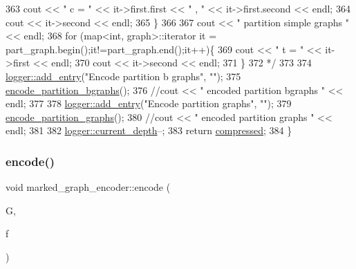 \begin{DoxyCode}
363 \textcolor{comment}{    cout << " c = " << it->first.first << " , " << it->first.second << endl;}
364 \textcolor{comment}{    cout << it->second << endl;}
365 \textcolor{comment}{  \}}
366 \textcolor{comment}{}
367 \textcolor{comment}{  cout << " partition simple graphs " << endl;}
368 \textcolor{comment}{  for (map<int, graph>::iterator it = part\_graph.begin();it!=part\_graph.end();it++)\{}
369 \textcolor{comment}{    cout << " t = " << it->first << endl;}
370 \textcolor{comment}{    cout << it->second << endl;}
371 \textcolor{comment}{  \}}
372 \textcolor{comment}{  */}
373 
374   \hyperlink{classlogger_a710163deb17bc81f70d53d285b8ac9ac}{logger::add\_entry}(\textcolor{stringliteral}{"Encode partition b graphs"}, \textcolor{stringliteral}{""});
375   \hyperlink{classmarked__graph__encoder_aa113c4870e3221faa332b2151b63d9e6}{encode\_partition\_bgraphs}();
376   \textcolor{comment}{//cout << " encoded partition bgraphs " << endl;}
377 
378   \hyperlink{classlogger_a710163deb17bc81f70d53d285b8ac9ac}{logger::add\_entry}(\textcolor{stringliteral}{"Encode partition graphs"}, \textcolor{stringliteral}{""});
379   \hyperlink{classmarked__graph__encoder_a654463d4b256b84225f5944b5e361ebf}{encode\_partition\_graphs}();
380   \textcolor{comment}{//cout << " encoded partition graphs " << endl;}
381   
382   \hyperlink{classlogger_a9d29b49bd318a719a8e85b59eac54fe0}{logger::current\_depth}--;
383   \textcolor{keywordflow}{return} \hyperlink{classmarked__graph__encoder_ac2ded200860fdd2321f86dd76b28bcb3}{compressed};
384 \}
\end{DoxyCode}
\mbox{\label{classmarked__graph__encoder_a75b32c3c4557bec3322df60ac476fdc9}} 
\subsubsection{\texorpdfstring{encode()}{encode()}\hspace{0.1cm}{\footnotesize\ttfamily [2/2]}}
{\footnotesize\ttfamily void marked\+\_\+graph\+\_\+encoder\+::encode (\begin{DoxyParamCaption}\item[{const \hyperlink{classmarked__graph}{marked\+\_\+graph} \&}]{G,  }\item[{F\+I\+LE $\ast$}]{f }\end{DoxyParamCaption})}



